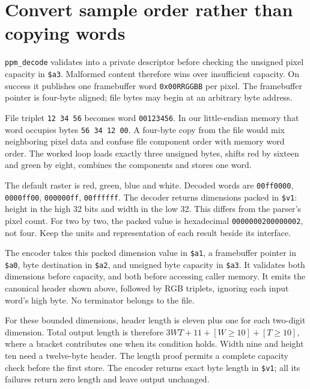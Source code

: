 \section{Convert sample order rather than copying words}

\texttt{ppm\_decode} validates into a private descriptor before checking the
unsigned pixel capacity in \texttt{\$a3}. Malformed content therefore wins over
insufficient capacity. On success it publishes one framebuffer word
\texttt{0x00RRGGBB} per pixel. The framebuffer pointer is four-byte aligned;
file bytes may begin at an arbitrary byte address.

File triplet \texttt{12 34 56} becomes word \texttt{00123456}. In our
little-endian memory that word occupies bytes \texttt{56 34 12 00}.
A four-byte copy from the file would mix neighboring pixel data and confuse
file component order with memory word order. The worked loop loads exactly
three unsigned bytes, shifts red by sixteen and green by eight, combines the
components and stores one word.



The default raster is red, green, blue and white. Decoded words are
\texttt{00ff0000}, \texttt{0000ff00}, \texttt{000000ff}, \texttt{00ffffff}.
The decoder returns dimensions packed in \texttt{\$v1}: height in the high
32 bits and width in the low 32. This differs from the parser's pixel count.
For two by two, the packed value is hexadecimal \texttt{0000000200000002},
not four. Keep the units and representation of each result beside its interface.

The encoder takes this packed dimension value in \texttt{\$a1}, a framebuffer
pointer in \texttt{\$a0}, byte destination in \texttt{\$a2}, and unsigned byte
capacity in \texttt{\$a3}. It validates both dimensions before capacity, and
both before accessing caller memory. It emits the canonical header shown above,
followed by RGB triplets, ignoring each input word's high byte. No terminator
belongs to the file.

For these bounded dimensions, header length is eleven plus one for each
two-digit dimension. Total output length is therefore
$3WT+11+[W\geq10]+[T\geq10]$, where a bracket contributes one when its
condition holds. Width nine and height ten need a twelve-byte header. The
length proof permits a complete capacity check before the first store. The
encoder returns exact byte length in \texttt{\$v1}; all its failures return
zero length and leave output unchanged.

